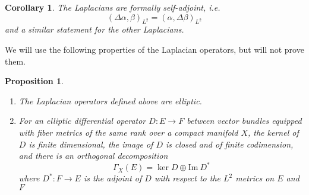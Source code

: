 \documentclass[psamsfonts, 12pt]{amsart}
\newtheorem{cor}[thm]{Corollary}
\newtheorem{prop}[thm]{Proposition}
\theoremstyle{definition}
\theoremstyle{remark}
\newcommand{\enumbreak}{\ \\ \vspace{-\baselineskip}}
\begin{document}
%
\begin{cor}
The Laplacians are formally self-adjoint, i.e.
\[
(\Delta\alpha,\beta)_{L^2} = (\alpha,\Delta\beta)_{L^2}
\]
and a similar statement for the other Laplacians.
\end{cor}
%
We will use the following properties of the Laplacian operators, but will not
prove them.
\begin{prop}\enumbreak
\begin{enumerate}
  \item The Laplacian operators defined above are elliptic.
  \item For an elliptic differential operator $D : E \to F$ between vector bundles
  equipped with fiber metrics of the same rank over a compact manifold $X$, the kernel
  of $D$ is finite dimensional, the image of $D$ is closed and of finite codimension,
  and there is an orthogonal decomposition
  \[
  \Gamma_X(E) = \ker D \oplus \mathrm{Im}~D^*
  \]
  where $D^* : F \to E$ is the adjoint of $D$ with respect to the $L^2$ metrics on
  $E$ and $F$
\end{enumerate}
\end{prop}
%
\end{document}
